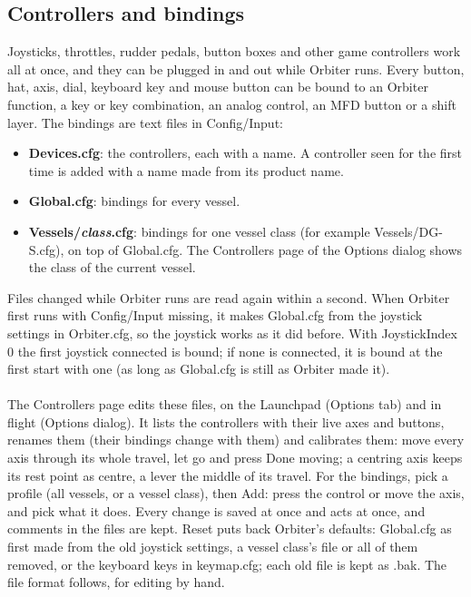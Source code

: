 \documentclass[Orbiter User Manual.tex]{subfiles}
\begin{document}
\subsection{Controllers and bindings}
\label{ssec:input_bindings}
Joysticks, throttles, rudder pedals, button boxes and other game controllers work all at once, and they can be plugged in and out while Orbiter runs. Every button, hat, axis, dial, keyboard key and mouse button can be bound to an Orbiter function, a key or key combination, an analog control, an MFD button or a shift layer. The bindings are text files in Config/Input:
\begin{itemize}
\item \textbf{Devices.cfg}: the controllers, each with a name. A controller seen for the first time is added with a name made from its product name.
\item \textbf{Global.cfg}: bindings for every vessel.
\item \textbf{Vessels/\textit{class}.cfg}: bindings for one vessel class (for example Vessels/DG-S.cfg), on top of Global.cfg. The Controllers page of the Options dialog shows the class of the current vessel.
\end{itemize}
Files changed while Orbiter runs are read again within a second. When Orbiter first runs with Config/Input missing, it makes Global.cfg from the joystick settings in Orbiter.cfg, so the joystick works as it did before. With JoystickIndex 0 the first joystick connected is bound; if none is connected, it is bound at the first start with one (as long as Global.cfg is still as Orbiter made it).\\
\\
The Controllers page edits these files, on the Launchpad (Options tab) and in flight (Options dialog). It lists the controllers with their live axes and buttons, renames them (their bindings change with them) and calibrates them: move every axis through its whole travel, let go and press Done moving; a centring axis keeps its rest point as centre, a lever the middle of its travel. For the bindings, pick a profile (all vessels, or a vessel class), then Add: press the control or move the axis, and pick what it does. Every change is saved at once and acts at once, and comments in the files are kept. Reset puts back Orbiter's defaults: Global.cfg as first made from the old joystick settings, a vessel class's file or all of them removed, or the keyboard keys in keymap.cfg; each old file is kept as .bak. The file format follows, for editing by hand.\\
\end{document}
